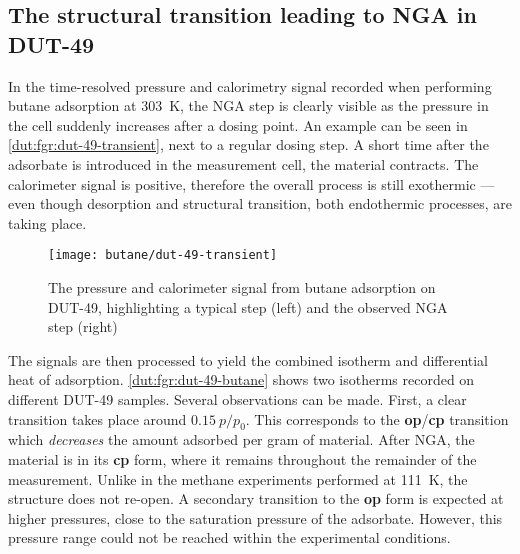 
\subsection{The structural transition leading to NGA in DUT-49}

In the time-resolved pressure and calorimetry signal recorded when
performing butane adsorption at \SI{303}{\kelvin}, the NGA step 
is clearly visible as the pressure in the cell suddenly increases 
after a dosing point. An example can be seen 
in \autoref{dut:fgr:dut-49-transient}, next to a regular dosing step.
A short time after the adsorbate is introduced in the measurement
cell, the material contracts. The calorimeter signal is
positive, therefore the overall process is still exothermic --- even
though desorption and structural transition, both endothermic
processes, are taking place.

\begin{figure}[htb]
    \texttt{[image: butane/dut-49-transient]}%
    \caption{The pressure and calorimeter signal from butane adsorption
    on DUT-49, highlighting a typical step (left) and the 
    observed NGA step (right)}%
    \label{dut:fgr:dut-49-transient}
\end{figure}

The signals are then processed to yield the combined isotherm and
differential heat of adsorption. \autoref{dut:fgr:dut-49-butane} shows
two isotherms recorded on different DUT-49 samples. 
Several observations can be made. First, a clear transition takes place
around \(0.15~p/p_0\). This corresponds to the \textbf{op}/\textbf{cp} 
transition which \textit{decreases} the amount adsorbed per gram 
of material. After NGA, the material is in its \textbf{cp} form,
where it remains throughout the remainder of the measurement. 
Unlike in the methane experiments performed at 
\SI{111}{\kelvin}, the structure does not re-open. A secondary 
transition to the \textbf{op} form is expected at higher pressures,
close to the saturation pressure of the adsorbate. However, this 
pressure range could not be reached within the experimental conditions.


